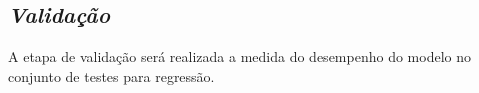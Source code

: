 \subsection{\textit{Validação}}\label{sec:Cap3_Validacao}

A etapa de validação será realizada a medida do desempenho do modelo no conjunto de testes para regressão.











